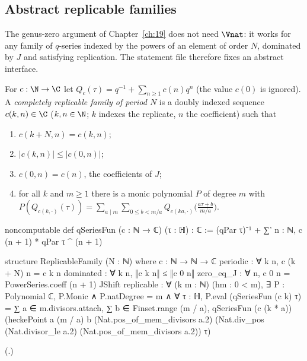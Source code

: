 \subsection{Abstract replicable families}

The genus-zero argument of Chapter~\ref{ch:19} does not need $\Vnat$: it works for any family of $q$-series indexed by
the powers of an element of order $N$, dominated by $J$ and satisfying replication.  The statement file therefore
fixes an abstract interface.

\begin{definition}\label{ch16:def:family}
For $c:\N\to\C$ let $Q_c(\tau)=q^{-1}+\sum_{n\ge1}c(n)q^n$ (the value $c(0)$ is ignored).  A \emph{completely replicable
family of period $N$} is a doubly indexed sequence $c(k,n)\in\C$ ($k,n\in\N$; $k$ indexes the replicate, $n$ the
coefficient) such that
\begin{enumerate}[label=(\roman*)]
\item $c(k+N,n)=c(k,n)$;
\item $|c(k,n)|\le|c(0,n)|$;
\item $c(0,n)=c(n)$, the coefficients of $J$;
\item for all $k$ and $m\ge1$ there is a monic polynomial $P$ of degree $m$ with
  $P(Q_{c(k,\cdot)}(\tau))=\sum_{a\mid m}\sum_{0\le b<m/a}Q_{c(ka,\cdot)}\bigl(\frac{a\tau+b}{m/a}\bigr)$.
\end{enumerate}
\end{definition}
\begin{leancode}
noncomputable def qSeriesFun (c : ℕ → ℂ) (τ : ℍ) : ℂ :=
  (qPar τ)⁻¹ + ∑' n : ℕ, c (n + 1) * qPar τ ^ (n + 1)

structure ReplicableFamily (N : ℕ) where
  c : ℕ → ℕ → ℂ
  periodic : ∀ k n, c (k + N) n = c k n
  dominated : ∀ k n, ‖c k n‖ ≤ ‖c 0 n‖
  zero_eq_J : ∀ n, c 0 n = PowerSeries.coeff (n + 1) JShift
  replicable : ∀ (k m : ℕ) (hm : 0 < m), ∃ P : Polynomial ℂ, P.Monic ∧ P.natDegree = m ∧
    ∀ τ : ℍ, P.eval (qSeriesFun (c k) τ) =
      ∑ a ∈ m.divisors.attach, ∑ b ∈ Finset.range (m / a),
        qSeriesFun (c (k * a)) (heckePoint a (m / a) b (Nat.pos_of_mem_divisors a.2)
          (Nat.div_pos (Nat.divisor_le a.2) (Nat.pos_of_mem_divisors a.2)) τ)
\end{leancode}
(.)
